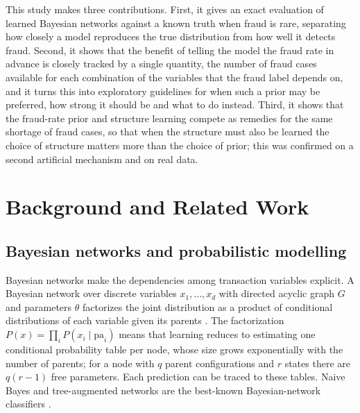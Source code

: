 \documentclass[final,5p,times,authoryear]{elsarticle}
\begin{document}
This study makes three contributions. First, it gives an exact evaluation of learned Bayesian networks against a known truth when fraud is rare, separating how closely a model reproduces the true distribution from how well it detects fraud. Second, it shows that the benefit of telling the model the fraud rate in advance is closely tracked by a single quantity, the number of fraud cases available for each combination of the variables that the fraud label depends on, and it turns this into exploratory guidelines for when such a prior may be preferred, how strong it should be and what to do instead. Third, it shows that the fraud-rate prior and structure learning compete as remedies for the same shortage of fraud cases, so that when the structure must also be learned the choice of structure matters more than the choice of prior; this was confirmed on a second artificial mechanism and on real data.

\section{Background and Related Work}\label{sec:related}
\subsection{Bayesian networks and probabilistic modelling}
Bayesian networks make the dependencies among transaction variables explicit. A Bayesian network over discrete variables $x_1,\dots,x_d$ with directed acyclic graph $G$ and parameters $\theta$ factorizes the joint distribution as a product of conditional distributions of each variable given its parents \citep{koller2009}. The factorization $P(x)=\prod_i P(x_i\mid \mathrm{pa}_i)$ means that learning reduces to estimating one conditional probability table per node, whose size grows exponentially with the number of parents; for a node with $q$ parent configurations and $r$ states there are $q(r-1)$ free parameters. Each prediction can be traced to these tables. Naive Bayes and tree-augmented networks are the best-known Bayesian-network classifiers \citep{friedman1997}.
\end{document}
